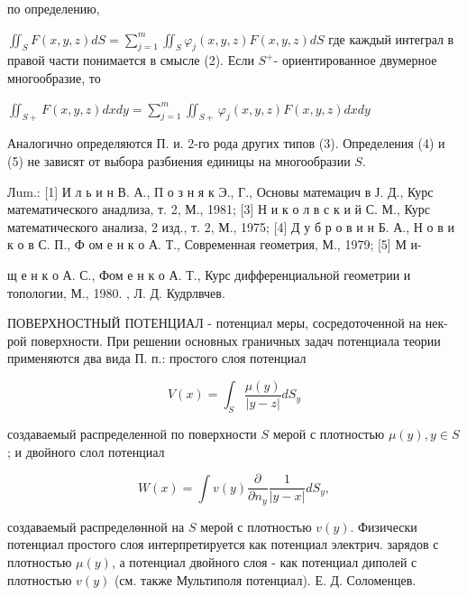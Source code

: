 \documentclass[10pt]{article}
\begin{document}
по определению,



$\iint_{S} F(x, y, z) d S=\sum_{j=1}^{m} \iint_{S} \varphi_{j}(x, y, z) F(x, y, z) d S$ где каждый интеграл в правой части понимается в смысле (2). Если $S^{+}$- ориентированное двумерное многообразие, то



$\iint_{S+} F(x, y, z) d x d y=\sum_{j=1}^{m} \iint_{S+} \varphi_{j}(x, y, z) F(x, y, z) d x d y$



Аналогично определяются П. и. 2-го рода других типов (3). Определения (4) и (5) не зависят от выбора разбиения единицы на многообразии $S$.



Лum.: [1] И л ь и н В. А., П о з н я к Э., Г., Основы матемацич в Ј. Д., Курс математического анадлиза, т. 2, М., 1981; [3] Н и к о л в с к и й С. М., Курс математического анализа, 2 изд., т. 2, М., 1975; [4] Д у б р о в и н Б. А., Н о в и к о в С. П., Ф ом е н к о А. Т., Современная геометрия, М., 1979; [5] М и-

щ е н к о А. С., Фом е н к о А. Т., Курс дифференциальной геометрии и топологии, М., 1980. , Л. Д. Кудрлвчев.



ПОВЕРХНОСТНЫЙ ПОТЕНЦИАЛ - потенциал меры, сосредоточенной на нек-рой поверхности. При решении основных граничных задач потенциала теории применяются два вида П. п.: простого слоя потенциал



\[

V(x)=\int_{S} \frac{\mu(y)}{|y-z|} d S_{y}

\]



создаваемый распределенной по поверхности $S$ мерой с плотностью $\mu(y), y \in S$; и двойного слол потенциал



\[

W(x)=\int v(y) \frac{\partial}{\partial n_{y}} \frac{1}{|y-x|} d S_{y},

\]



создаваемый распределөнной на $S$ мерой с плотностью $v(y)$. Физически потенциал простого слоя интерпретируется как потенциал электрич. зарядов с плотностью $\mu(y)$, а потенциал двойного слоя - как потенциал диполей с плотностью $v(y)$ (см. также Мультиполя потенциал). Е. Д. Соломенцев.
\end{document}
